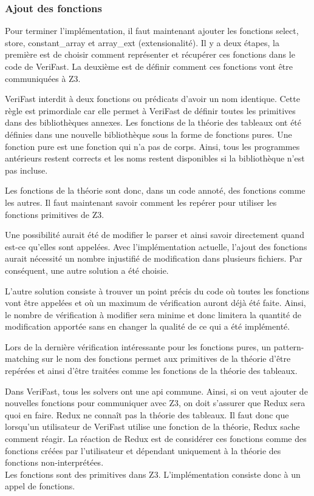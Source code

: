 \documentclass[11pt,openany]{article}
\newcommand{\verifast}{VeriFast}
\begin{document}
			
		\subsubsection{Ajout des fonctions}
	Pour terminer l'impl\'ementation, il faut maintenant ajouter les fonctions select, store, constant\_array et array\_ext (extensionalit\'e). Il y a deux \'etapes, la premi\`ere est de choisir comment repr\'esenter  et r\'ecup\'erer ces fonctions dans le code de \verifast{}. La deuxi\`eme est de d\'efinir comment ces fonctions vont \^etre communiqu\'ees \`a Z3.
	
		\verifast{} interdit \`a deux fonctions ou pr\'edicats d'avoir un nom identique. Cette r\`egle est primordiale car elle permet \`a \verifast{} de d\'efinir toutes les primitives dans des biblioth\`eques annexes. Les fonctions de la th\'eorie des tableaux ont \'et\'e d\'efinies dans une nouvelle biblioth\`eque sous la forme de fonctions pures. Une fonction pure est une fonction qui n'a pas de corps. Ainsi, tous les programmes ant\'erieurs restent corrects et les noms restent disponibles si la biblioth\`eque n'est pas incluse.
		
		Les fonctions de la th\'eorie sont donc, dans un code annot\'e, des fonctions comme les autres. Il faut maintenant savoir comment les rep\'erer pour utiliser les fonctions primitives de Z3.
		
		Une possibilit\'e aurait \'et\'e de modifier le parser et ainsi savoir directement quand est-ce qu'elles sont appel\'ees. Avec l'impl\'ementation actuelle, l'ajout des fonctions aurait n\'ecessit\'e un nombre injustifi\'e de modification dans plusieurs fichiers. Par cons\'equent, une autre solution a \'et\'e choisie. 
		
		L'autre solution consiste \`a trouver un point pr\'ecis du code o\`u toutes les fonctions vont \^etre appel\'ees et o\`u un maximum de v\'erification auront d\'ej\`a \'et\'e faite. Ainsi, le nombre de v\'erification \`a modifier sera minime et donc limitera la quantit\'e de modification apport\'ee sans en changer la qualit\'e de ce qui a \'et\'e impl\'ement\'e.
		
		Lors de la derni\`ere v\'erification int\'eressante pour les fonctions pures, un pattern-matching sur le nom des fonctions permet aux primitives de la th\'eorie d'\^etre rep\'er\'ees et ainsi d'\^etre trait\'ees comme les fonctions de la th\'eorie des tableaux.
		
		Dans \verifast{}, tous les solvers ont une api commune. Ainsi, si on veut ajouter de nouvelles fonctions pour communiquer avec Z3, on doit s'assurer que Redux sera quoi en faire.
			Redux ne conna\^it pas la th\'eorie des tableaux. Il faut donc que lorsqu'un utilisateur de \verifast{} utilise une fonction de la th\'eorie, Redux sache comment r\'eagir. La r\'eaction de Redux est de consid\'erer ces fonctions comme des fonctions cr\'e\'ees par l'utilisateur et d\'ependant uniquement \`a la th\'eorie des fonctions non-interpr\'et\'ees.\\
			Les fonctions sont des primitives dans Z3. L'impl\'ementation consiste donc \`a un appel de fonctions.
			
\end{document}
